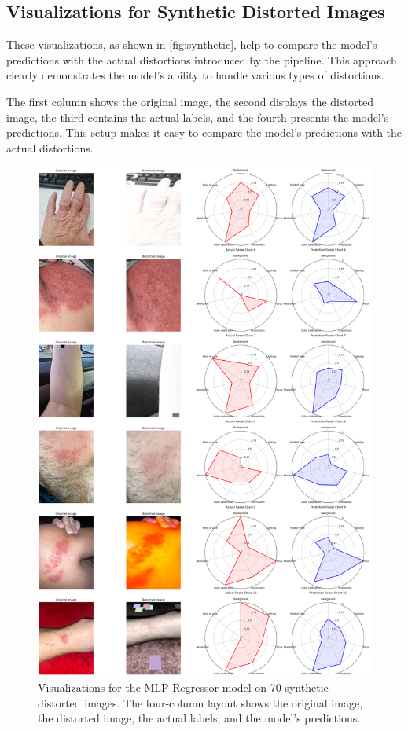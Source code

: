 \subsection{Visualizations for Synthetic Distorted Images}
\label{subsec:SyntheticDistortedImages}
These visualizations, as shown in \autoref{fig:synthetic}, help to compare the model's predictions with the actual distortions introduced by the pipeline. This approach clearly demonstrates the model's ability to handle various types of distortions. \par
\vspace{\baselineskip}
\noindent
The first column shows the original image, the second displays the distorted image, the third contains the actual labels, and the fourth presents the model’s predictions. This setup makes it easy to compare the model’s predictions with the actual distortions. \par
\begin{figure}[ht]
    \centering
    \includegraphics[keepaspectratio,width=15cm]{img/synthetic.png}
    \caption{Visualizations for the MLP Regressor model on 70 synthetic distorted images. The four-column layout shows the original image, the distorted image, the actual labels, and the model's predictions.}
    \label{fig:synthetic}
\end{figure}

